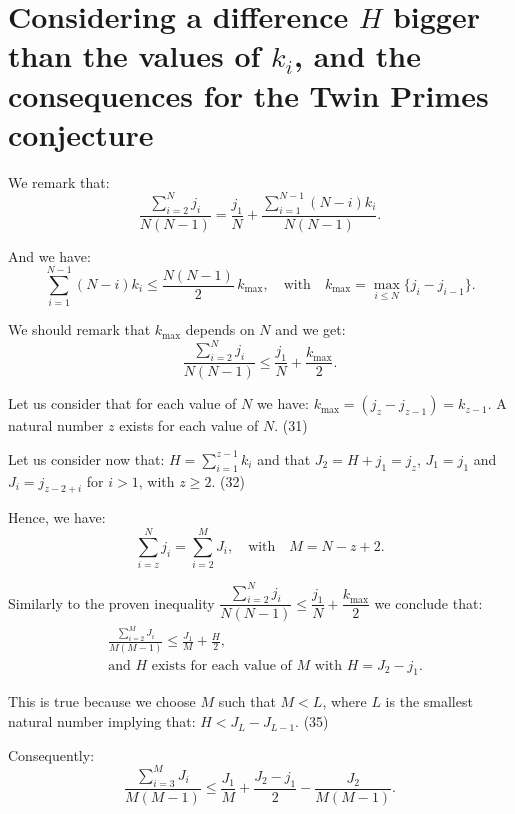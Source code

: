 \documentclass[11pt]{article}
\begin{document}
\section{Considering a difference $H$ bigger than the values of $k_i$, and the consequences for the Twin Primes conjecture}

We remark that:
\begin{equation}
\frac{\sum_{i=2}^{N} j_i}{N(N-1)} = \frac{j_1}{N} + \frac{\sum_{i=1}^{N-1}(N-i)k_i}{N(N-1)}.
\end{equation}

And we have:
\begin{equation}
\sum_{i=1}^{N-1}(N-i)k_i \leq \frac{N(N-1)}{2}\, k_{\max}, \quad\text{with}\quad k_{\max} = \max_{i\leq N}\{j_i-j_{i-1}\}.
\end{equation}

We should remark that $k_{\max}$ depends on $N$ and we get:
\begin{equation}
\frac{\sum_{i=2}^{N} j_i}{N(N-1)} \leq \frac{j_1}{N} + \frac{k_{\max}}{2}.
\end{equation}

Let us consider that for each value of $N$ we have: $k_{\max} = (j_z-j_{z-1}) = k_{z-1}$. A natural number $z$ exists for each value of $N$. \hfill (31)

Let us consider now that: $H = \sum_{i=1}^{z-1} k_i$ and that $J_2 = H+j_1 = j_z$, $J_1 = j_1$ and $J_i = j_{z-2+i}$ for $i>1$, with $z\geq 2$. \hfill (32)

Hence, we have:
\begin{equation}
\sum_{i=z}^{N} j_i = \sum_{i=2}^{M} J_i, \quad\text{with}\quad M = N-z+2.
\end{equation}

Similarly to the proven inequality $\dfrac{\sum_{i=2}^{N} j_i}{N(N-1)} \leq \dfrac{j_1}{N} + \dfrac{k_{\max}}{2}$ we conclude that:
\begin{equation}
\begin{aligned}&\frac{\sum_{i=2}^{M} J_i}{M(M-1)} \leq \frac{J_1}{M} + \frac{H}{2},\\ &\text{and } H \text{ exists for each value of } M \text{ with } H = J_2-j_1.\end{aligned}
\end{equation}

This is true because we choose $M$ such that $M<L$, where $L$ is the smallest natural number implying that: $H < J_L - J_{L-1}$. \hfill (35)

Consequently:
\begin{equation}
\frac{\sum_{i=3}^{M} J_i}{M(M-1)} \leq \frac{J_1}{M} + \frac{J_2-j_1}{2} - \frac{J_2}{M(M-1)}.
\end{equation}
\end{document}
